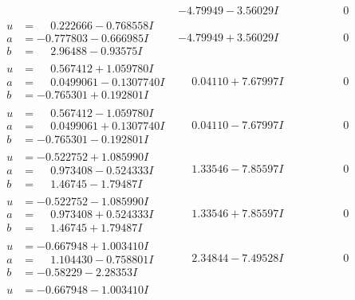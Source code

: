 \documentclass[1p]{elsarticle_modified}
\theoremstyle{definition}
\begin{document}
$$\begin{array}{c|c|c}
 & -4.79949 - 3.56029 I & \phantom{-0.000000 } 0 \\ \hline\begin{aligned}
u &= \phantom{-}0.222666 - 0.768558 I \\
a &= -0.777803 - 0.666985 I \\
b &= \phantom{-}2.96488 - 0.93575 I\end{aligned}
 & -4.79949 + 3.56029 I & \phantom{-0.000000 } 0 \\ \hline\begin{aligned}
u &= \phantom{-}0.567412 + 1.059780 I \\
a &= \phantom{-}0.0499061 - 0.1307740 I \\
b &= -0.765301 + 0.192801 I\end{aligned}
 & \phantom{-}0.04110 + 7.67997 I & \phantom{-0.000000 } 0 \\ \hline\begin{aligned}
u &= \phantom{-}0.567412 - 1.059780 I \\
a &= \phantom{-}0.0499061 + 0.1307740 I \\
b &= -0.765301 - 0.192801 I\end{aligned}
 & \phantom{-}0.04110 - 7.67997 I & \phantom{-0.000000 } 0 \\ \hline\begin{aligned}
u &= -0.522752 + 1.085990 I \\
a &= \phantom{-}0.973408 - 0.524333 I \\
b &= \phantom{-}1.46745 - 1.79487 I\end{aligned}
 & \phantom{-}1.33546 - 7.85597 I & \phantom{-0.000000 } 0 \\ \hline\begin{aligned}
u &= -0.522752 - 1.085990 I \\
a &= \phantom{-}0.973408 + 0.524333 I \\
b &= \phantom{-}1.46745 + 1.79487 I\end{aligned}
 & \phantom{-}1.33546 + 7.85597 I & \phantom{-0.000000 } 0 \\ \hline\begin{aligned}
u &= -0.667948 + 1.003410 I \\
a &= \phantom{-}1.104430 - 0.758801 I \\
b &= -0.58229 - 2.28353 I\end{aligned}
 & \phantom{-}2.34844 - 7.49528 I & \phantom{-0.000000 } 0 \\ \hline\begin{aligned}
u &= -0.667948 - 1.003410 I \\

\end{aligned}
\end{array}$$
\end{document}
